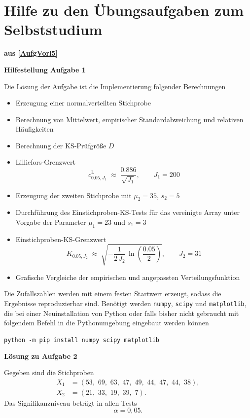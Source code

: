 \section{Hilfe zu den Übungsaufgaben zum Selbststudium}
\textbf{aus \ref{AufgVorl5}}

\textbf{\large Hilfestellung Aufgabe 1}

Die Lösung der Aufgabe ist die Implementierung folgender Berechnungen
\begin{itemize}
\item Erzeugung einer normalverteilten Stichprobe
\item Berechnung von Mittelwert, empirischer Standardabweichung und relativen Häufigkeiten
\item Berechnung der KS-Prüfgröße $D$
\item Lilliefors-Grenzwert
  $$
  c_{0.05,J_1}^{\mathrm L} \; \approx \; \frac{0.886}{\sqrt{J_1}}, \qquad J_1 = 200
  $$
\item Erzeugung der zweiten Stichprobe mit $\mu_2=35$, $s_2=5$
\item Durchführung des Einstichproben-KS-Tests für das vereinigte Array unter Vorgabe 
der Parameter $\mu_1 = 23$ und $s_1 = 3$
\item Einstichproben-KS-Grenzwert 
$$
K_{0.05, J_2} \; \approx \; \sqrt{-\frac{1}{2 \, J_2} \, \ln(\frac{0.05}{2})}, \qquad J_2 = 31
$$
\item Grafische Vergleiche der empirischen und angepassten Verteilungsfunktion
\end{itemize}

Die Zufallszahlen werden mit einem festen Startwert erzeugt, sodass die Ergebnisse reproduzierbar sind. Benötigt werden \texttt{numpy}, \texttt{scipy} und \texttt{matplotlib}, die bei einer Neuinstallation von
Python oder falls bisher nicht gebraucht mit folgendem Befehl in die Pythonumgebung eingebaut werden können

\texttt{python -m pip install numpy scipy matplotlib}

\vspace{3mm}



\newpage

\textbf{\large Lösung zu Aufgabe 2}

Gegeben sind die Stichproben
\begin{align*}
X_1 &= (53,\,\,69,\,\,63,\,\,47,\,\,49,\,\,44,\,\,47,\,\,44,\,\,38),\\
X_2 &= (21,\,\,33,\,\,19,\,\,39,\,\,7).
\end{align*}
Das Signifikanzniveau beträgt in allen Tests
\[
\alpha=0{,}05.
\]

